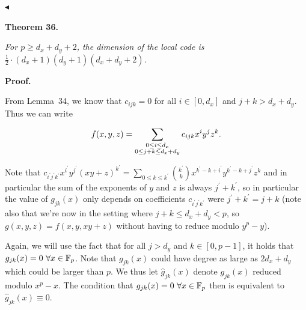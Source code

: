 $\blacktriangleleft$\par





\par\medskip\noindent\textbf{
\textbf{Theorem 36}\textbf{.}
}\par



\emph{For $p\geq d_{x}+d_{y}+2$, the dimension of the local code is $\frac{1}{2}\cdot(d_{x}+1)(d_{y}+1)(d_{x}+d_{y}+2)$.}\par







\par\medskip\noindent\textbf{Proof.}\par




From Lemma 34, we know that $c_{ijk}=0$ for all $i\in[0,d_{x}]$ and $j+k>d_{x}+d_{y}$. Thus we can write\par


\[\begin{gathered}
\displaystyle f(x,y,z) \displaystyle=\sum_{\begin{subarray}{c}0\leq i\leq d_{x}\\
0\leq j+k\leq d_{x}+d_{y}\end{subarray}}c_{ijk}x^{i}y^{j}z^{k}.
\end{gathered}\]


Note that $c_{i^{\prime}j^{\prime}k^{\prime}}x^{i^{\prime}}y^{j^{\prime}}(xy+z)^{k^{\prime}}=\sum_{0\leq k\leq k^{\prime}}\binom{k^{\prime}}{k}x^{k^{\prime}-k+i^{\prime}}y^{k^{\prime}-k+j^{\prime}}z^{k}$ and in particular the sum of the exponents of $y$ and $z$ is always $j^{\prime}+k^{\prime}$, so in particular the value of $g_{jk}(x)$ only depends on coefficients $c_{i^{\prime}j^{\prime}k^{\prime}}$ were $j^{\prime}+k^{\prime}=j+k$ (note also that we’re now in the setting where $j+k\leq d_{x}+d_{y}<p$, so $g(x,y,z)=f(x,y,xy+z)$ without having to reduce modulo $y^{p}-y$).\par




Again, we will use the fact that for all $j>d_{y}$ and $k\in[0,p-1]$, it holds that $g_{jk}(x)=0\nobreak\ \forall x\in\mathbb{F}_{p}$. Note that $g_{jk}(x)$ could have degree as large as $2d_{x}+d_{y}$ which could be larger than $p$. We thus let $\hat{g}_{jk}(x)$ denote $g_{jk}(x)$ reduced modulo $x^{p}-x$. The condition that $g_{jk}(x)=0\nobreak\ \forall x\in\mathbb{F}_{p}$ then is equivalent to $\hat{g}_{jk}(x)\equiv 0$.\par




